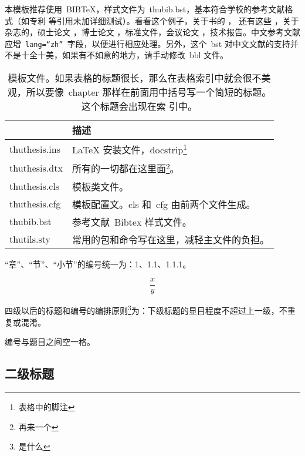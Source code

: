 本模板推荐使用~BIB\TeX，样式文件为~thubib.bst，基本符合学校的参考文献格式（如专利
等引用未加详细测试）。看看这个例子，关于书的
\cite{tex, companion, ColdSources}，
还有这些 \cite{Krasnogor2004e, clzs, zjsw}，关于杂志的\cite{ELIDRISSI94,
  MELLINGER96, SHELL02}，硕士论文 \cite{zhubajie, metamori2004}，博士论文 \cite{shaheshang, FistSystem01}，标准文件\cite{IEEE-1363}，会议论文 \cite{DPMG,kocher99}，技术报告\cite{NPB2}。中文参考文献\cite{cnarticle}应增~\texttt{lang=``zh''}~字段，以便进行相应处理。另外，这个~bst 对中文文献\cite{cnproceed}的支持并不是十全十美，如果有不如意的地方，请手动修改~bbl 文件。

    \begin{table}[htb]
  \centering
  \begin{minipage}[t]{1\linewidth} 
  \caption[模板文件]{模板文件。如果表格的标题很长，那么在表格索引中就会很不美
    观，所以要像~chapter 那样在前面用中括号写一个简短的标题。这个标题会出现在索
    引中。}
  \label{tab:template-files}
    \begin{tabular*}{\linewidth}{lp{10cm}}
      \toprule[1.5pt]
      {} & {\bf 描述} \\\midrule[1pt]
      thuthesis.ins & \LaTeX{} 安装文件，docstrip\footnote{表格中的脚注} \\
      thuthesis.dtx & 所有的一切都在这里面\footnote{再来一个}。\\
      thuthesis.cls & 模板类文件。\\
      thuthesis.cfg & 模板配置文。cls 和~cfg 由前两个文件生成。\\
      thubib.bst    & 参考文献~Bibtex 样式文件。\\
      thutils.sty   & 常用的包和命令写在这里，减轻主文件的负担。\\
      \bottomrule[1.5pt]
    \end{tabular*}
  \end{minipage}
\end{table}

    “章”、“节”、“小节”的编号统一为：1、1.1、1.1.1。
    
\begin{equation}
\frac{x}{y}
\end{equation}


    四级以后的标题和编号的编排原则\footnote{是什么}为：下级标题的显目程度不超过上一级，不重复或混淆。

    编号与题目之间空一格。

    \subsection{二级标题}
    

